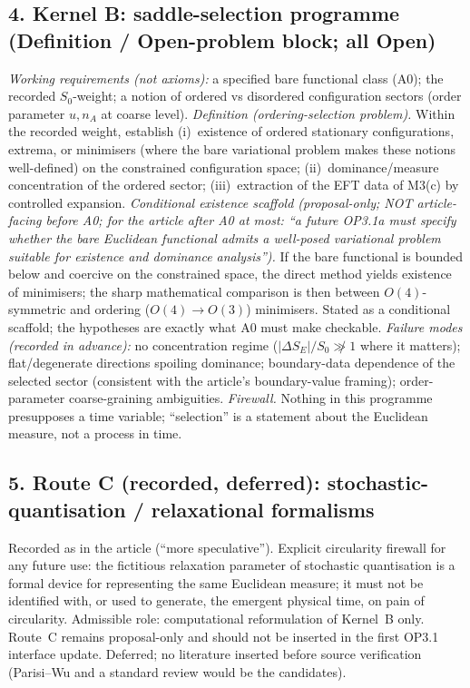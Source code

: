 \subsection*{4. Kernel B: saddle-selection programme
(Definition / Open-problem block; all Open)}
\emph{Working requirements (not axioms):} a specified bare
functional class (A0); the recorded $S_0$-weight; a notion of
ordered vs disordered configuration sectors (order parameter
$u,n_A$ at coarse level).
\emph{Definition (ordering-selection problem).}
Within the recorded weight, establish (i)~existence of ordered
stationary configurations, extrema, or minimisers (where the bare
variational problem makes these notions well-defined) on the
constrained configuration space; (ii)~dominance/measure concentration of the
ordered sector; (iii)~extraction of the EFT data of M3(c) by
controlled expansion.
\emph{Conditional existence scaffold (proposal-only; NOT
article-facing before A0; for the article after A0 at most: ``a
future OP3.1a must specify whether the bare Euclidean functional
admits a well-posed variational problem suitable for existence and
dominance analysis'').}
If the bare functional is bounded below and coercive on the
constrained space, the direct method yields existence of
minimisers; the sharp mathematical comparison is then between
$O(4)$-symmetric and ordering ($O(4)\to O(3)$) minimisers.
Stated as a conditional scaffold; the hypotheses are exactly what
A0 must make checkable.
\emph{Failure modes (recorded in advance):}
no concentration regime ($|\Delta S_E|/S_0\not\gg1$ where it
matters); flat/degenerate directions spoiling dominance;
boundary-data dependence of the selected sector (consistent with
the article's boundary-value framing); order-parameter
coarse-graining ambiguities.
\emph{Firewall.}
Nothing in this programme presupposes a time variable; ``selection''
is a statement about the Euclidean measure, not a process in time.

\subsection*{5. Route C (recorded, deferred): stochastic-quantisation
/ relaxational formalisms}
Recorded as in the article (``more speculative'').
Explicit circularity firewall for any future use: the fictitious
relaxation parameter of stochastic quantisation is a formal device
for representing the same Euclidean measure; it must not be
identified with, or used to generate, the emergent physical time,
on pain of circularity.
Admissible role: computational reformulation of Kernel~B only.
Route~C remains proposal-only and should not be inserted in the
first OP3.1 interface update.
Deferred; no literature inserted before source verification
(Parisi--Wu and a standard review would be the candidates).

